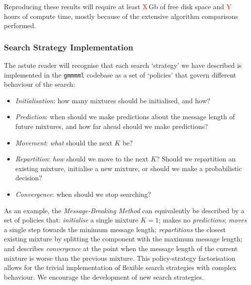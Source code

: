\documentclass{elsarticle}
\newcommand{\todo}[1]{\textcolor{red}{#1}}
\begin{document}
Reproducing these results will require at least \todo{X}\,Gb of free disk space
and \todo{Y}\,hours of compute time, mostly because of the extensive algorithm 
comparisons performed.

\subsubsection{Search Strategy Implementation}

The astute reader will recognise that each search `strategy' we have described
is implemented in the \texttt{gmmmml} codebase as a set of `policies' that govern
different behaviour of the search:
\begin{itemize}
\item \emph{Initialisation}: how many mixtures should be initialised, and how?
\item \emph{Prediction}: when should we make predictions about the message length of future mixtures, and how far ahead should we make predictions?
\item \emph{Movement}: \emph{what} should the next $K$ be?
\item \emph{Repartition}: \emph{how} should we move to the next $K$? Should we repartition an existing mixture, initialise a new mixture, or should we make a probabilistic decision?
\item \emph{Convergence}: when should we stop searching?
\end{itemize}

As an example, the \emph{Message-Breaking Method} can equivalently be described
by a set of policies that: 
	\emph{initialise} a single mixture $K = 1$; 
	makes no \emph{predictions};
	\emph{moves} a single step towards the minimum message length;
	\emph{repartitions} the closest existing mixture by splitting the component with the maximum message length; and 
	describes \emph{convergence} at the point when the message length of the current mixture is worse than the previous mixture. 
This policy-strategy factorisation allows for the trivial implementation of flexible search strategies with complex behaviour. We encourage the development of new search strategies.

\end{document}
